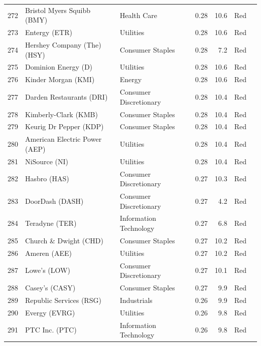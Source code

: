 \documentclass[11pt,a4paper]{article}
\begin{document}
{\begin{longtable}{r p{4.4cm} p{2.8cm} r r l l}
272 & Bristol Myers Squibb (BMY) & Health Care & 0.28 & 10.6 & \cellcolor[HTML]{F4B6B6}Red &  \\
273 & Entergy (ETR) & Utilities & 0.28 & 10.6 & \cellcolor[HTML]{F4B6B6}Red &  \\
274 & Hershey Company (The) (HSY) & Consumer Staples & 0.28 & 7.2 & \cellcolor[HTML]{F4B6B6}Red &  \\
275 & Dominion Energy (D) & Utilities & 0.28 & 10.6 & \cellcolor[HTML]{F4B6B6}Red &  \\
276 & Kinder Morgan (KMI) & Energy & 0.28 & 10.6 & \cellcolor[HTML]{F4B6B6}Red &  \\
277 & Darden Restaurants (DRI) & Consumer Discretionary & 0.28 & 10.4 & \cellcolor[HTML]{F4B6B6}Red &  \\
278 & Kimberly-Clark (KMB) & Consumer Staples & 0.28 & 10.4 & \cellcolor[HTML]{F4B6B6}Red &  \\
279 & Keurig Dr Pepper (KDP) & Consumer Staples & 0.28 & 10.4 & \cellcolor[HTML]{F4B6B6}Red &  \\
280 & American Electric Power (AEP) & Utilities & 0.28 & 10.4 & \cellcolor[HTML]{F4B6B6}Red &  \\
281 & NiSource (NI) & Utilities & 0.28 & 10.4 & \cellcolor[HTML]{F4B6B6}Red &  \\
282 & Hasbro (HAS) & Consumer Discretionary & 0.27 & 10.3 & \cellcolor[HTML]{F4B6B6}Red &  \\
283 & DoorDash (DASH) & Consumer Discretionary & 0.27 & 4.2 & \cellcolor[HTML]{F4B6B6}Red &  \\
284 & Teradyne (TER) & Information Technology & 0.27 & 6.8 & \cellcolor[HTML]{F4B6B6}Red &  \\
285 & Church \& Dwight (CHD) & Consumer Staples & 0.27 & 10.2 & \cellcolor[HTML]{F4B6B6}Red &  \\
286 & Ameren (AEE) & Utilities & 0.27 & 10.2 & \cellcolor[HTML]{F4B6B6}Red &  \\
287 & Lowe's (LOW) & Consumer Discretionary & 0.27 & 10.1 & \cellcolor[HTML]{F4B6B6}Red &  \\
288 & Casey's (CASY) & Consumer Staples & 0.27 & 9.9 & \cellcolor[HTML]{F4B6B6}Red &  \\
289 & Republic Services (RSG) & Industrials & 0.26 & 9.9 & \cellcolor[HTML]{F4B6B6}Red &  \\
290 & Evergy (EVRG) & Utilities & 0.26 & 9.8 & \cellcolor[HTML]{F4B6B6}Red &  \\
291 & PTC Inc. (PTC) & Information Technology & 0.26 & 9.8 & \cellcolor[HTML]{F4B6B6}Red &  \\

\end{longtable}}
\end{document}
